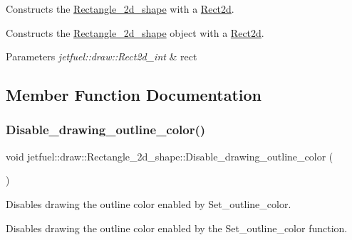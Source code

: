Constructs the \hyperlink{classjetfuel_1_1draw_1_1Rectangle__2d__shape}{Rectangle\+\_\+2d\+\_\+shape} with a \hyperlink{classjetfuel_1_1draw_1_1Rect2d}{Rect2d}. 

Constructs the \hyperlink{classjetfuel_1_1draw_1_1Rectangle__2d__shape}{Rectangle\+\_\+2d\+\_\+shape} object with a \hyperlink{classjetfuel_1_1draw_1_1Rect2d}{Rect2d}.


\begin{DoxyParams}{Parameters}
{\em jetfuel\+::draw\+::\+Rect2d\+\_\+int} & rect \\
\hline
\end{DoxyParams}


\subsection{Member Function Documentation}
\mbox{\label{classjetfuel_1_1draw_1_1Rectangle__2d__shape_a505b8a9c99a2a552d680d7fa1a7622d9}} 
\subsubsection{\texorpdfstring{Disable\+\_\+drawing\+\_\+outline\+\_\+color()}{Disable\_drawing\_outline\_color()}}
{\footnotesize\ttfamily void jetfuel\+::draw\+::\+Rectangle\+\_\+2d\+\_\+shape\+::\+Disable\+\_\+drawing\+\_\+outline\+\_\+color (\begin{DoxyParamCaption}{ }\end{DoxyParamCaption})\hspace{0.3cm}{\ttfamily [inline]}}



Disables drawing the outline color enabled by Set\+\_\+outline\+\_\+color. 

Disables drawing the outline color enabled by the Set\+\_\+outline\+\_\+color function. \mbox{\label{classjetfuel_1_1draw_1_1Rectangle__2d__shape_aba19e63d55c824de135932483fe40fcb}} 
